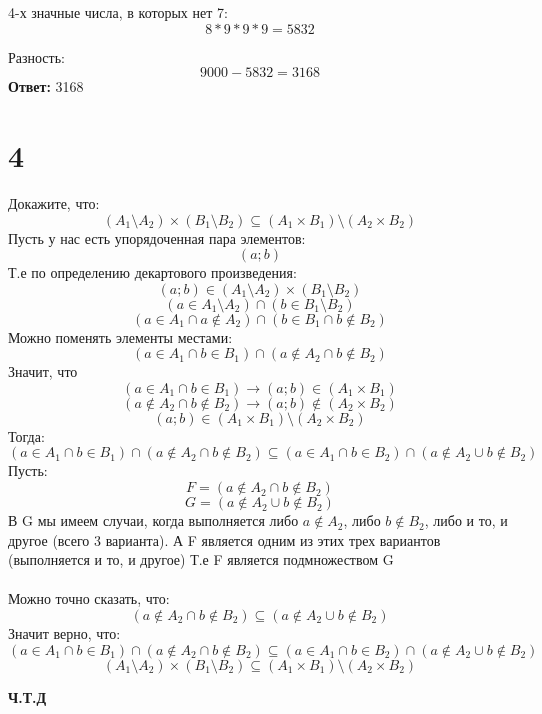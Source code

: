 \documentclass[a4paper,12pt]{article}
\begin{document}
4-х значные числа, в которых нет 7:
\[
8 * 9 * 9 * 9 = 5832
\]

Разность:
\[
9000 - 5832 = 3168
\]
\textbf{Ответ:} 3168
\section*{4}
Докажите, что:
\[
(A_1 \setminus A_2) \times (B_1 \setminus B_2) \subseteq (A_1 \times B_1) \setminus (A_2 \times B_2)
\]
Пусть у нас есть упорядоченная пара элементов:
\[
(a;b)
\]
Т.е по определению декартового произведения:
\[
(a;b) \in (A_1 \setminus A_2) \times (B_1 \setminus B_2) 
\]
\[
(a \in A_1 \setminus A_2) \cap (b \in B_1 \setminus B_2)
\]
\[
(a \in A_1 \cap a \notin A_2) \cap (b \in B_1 \cap b \notin B_2)
\]
Можно поменять элементы местами:
\[
(a \in A_1 \cap b \in B_1) \cap (a \notin A_2 \cap b \notin B_2) 
\]
Значит, что
\[
(a \in A_1 \cap b \in B_1) \rightarrow (a;b) \in (A_1 \times B_1)
\]
\[(a \notin A_2 \cap b \notin B_2) \rightarrow (a;b) \notin (A_2 \times B_2)
\]
\[
(a;b) \in (A_1 \times B_1) \setminus (A_2 \times B_2)
\]
Тогда:
\[
(a \in A_1 \cap b \in B_1) \cap (a \notin A_2 \cap b \notin B_2) \subseteq  (a \in A_1 \cap b \in B_2) \cap (a \notin A_2 \cup b \notin B_2)
\]
Пусть:
\[
F = (a \notin A_2 \cap b \notin B_2)
\]
\[
G = (a \notin A_2 \cup b \notin B_2)
\]
В G мы имеем случаи, когда выполняется либо $a \notin A_2$, либо $b \notin B_2$, либо и то, и другое (всего 3 варианта). А F является одним из этих трех вариантов (выполняется и то, и другое) Т.е F является подмножеством G
\\\\
Можно точно сказать, что:
\[
(a \notin A_2 \cap b \notin B_2) \subseteq (a \notin A_2 \cup b \notin B_2)
\]
Значит верно, что:
\[
(a \in A_1 \cap b \in B_1) \cap (a \notin A_2 \cap b \notin B_2) \subseteq  (a \in A_1 \cap b \in B_2) \cap (a \notin A_2 \cup b \notin B_2)
\]
\[
(A_1 \setminus A_2) \times (B_1 \setminus B_2) \subseteq (A_1 \times B_1) \setminus (A_2 \times B_2)
\]
\begin{center}
\textbf{Ч.Т.Д}
\end{center}
\end{document}
